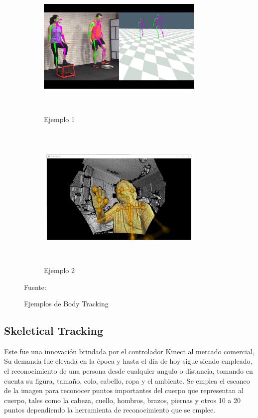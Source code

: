 \begin{figure}
	\centering
	\begin{subfigure}{.5\textwidth}
		\centering
		\includegraphics[width=8cm,height=7cm,]{./Images/examplebodytracking.jpg}
		\caption{Ejemplo 1}
		\label{bodyexa1}
	\end{subfigure}%
	\begin{subfigure}{0.5\textwidth}
		\centering
		\includegraphics[width=8cm,height=7cm,]{./Images/examplekinect.jpg}
		\caption{Ejemplo 2}
		\label{bodyexa2}
	\end{subfigure}
	\caption{Ejemplos de Body Tracking}
	\footnotesize Fuente: \cite{examplebodytracking} \cite{examplekinect}
	\label{bodyexafigure}
\end{figure}

\subsection{Skeletical Tracking}

Este fue una innovación brindada por el controlador Kinect al mercado comercial, Su demanda fue elevada en la época y hasta el día de hoy sigue siendo empleado, el reconocimiento de una persona desde cualquier angulo o distancia, tomando en cuenta su figura, tamaño, colo, cabello, ropa y el ambiente. Se emplea el escaneo de la imagen para reconocer puntos importantes del cuerpo que representan al cuerpo, tales como la cabeza, cuello, hombros, brazos, piernas y otros 10 a 20 puntos dependiendo la herramienta de reconocimiento que se emplee.

